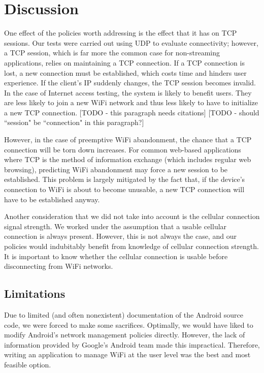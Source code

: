 \section{Discussion}
\label{sec:disc}

One effect of the policies worth addressing is the effect that it has on TCP sessions. Our tests were carried out using UDP to evaluate connectivity; however, a TCP session, which is far more the common case for non-streaming applications, relies on maintaining a TCP connection. If a TCP connection is lost, a new connection must be established, which costs time and hinders user experience. If the client's IP suddenly changes, the TCP session becomes invalid. In the case of Internet access testing, the system is likely to benefit users. They are less likely to join a new WiFi network and thus less likely to have to initialize a new TCP connection. [TODO - this paragraph needs citations] [TODO - should ``session" be ``connection" in this paragraph?]

However, in the case of preemptive WiFi abandonment, the chance that a TCP connection will be torn down increases. For common web-based applications where TCP is the method of information exchange (which includes regular web browsing), predicting WiFi abandonment may force a new session to be established. This problem is largely mitigated by the fact that, if the device's connection to WiFi is about to become unusable, a new TCP connection will have to be established anyway.

Another consideration that we did not take into account is the cellular connection signal strength. We worked under the assumption that a usable cellular connection is always present. However, this is not always the case, and our policies would indubitably benefit from knowledge of cellular connection strength. It is important to know whether the cellular connection is usable before disconnecting from WiFi networks.

\subsection{Limitations}

Due to limited (and often nonexistent) documentation of the Android source code, we were forced to make some sacrifices. Optimally, we would have liked to modify Android's network management policies directly. However, the lack of information provided by Google's Android team made this impractical. Therefore, writing an application to manage WiFi at the user level was the best and most feasible option.

